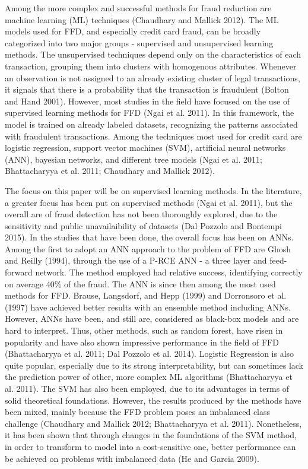 \documentclass[12pt,]{article}
\begin{document}
Among the more complex and successful methods for fraud reduction are
machine learning (ML) techniques (Chaudhary and Mallick 2012). The ML
models used for FFD, and especially credit card fraud, can be broadly
categorized into two major groups - supervised and unsupervised learning
methods. The unsupervised techniques depend only on the characteristics
of each transaction, grouping them into clusters with homogenous
attributes. Whenever an observation is not assigned to an already
existing cluster of legal transactions, it signals that there is a
probability that the transaction is fraudulent (Bolton and Hand 2001).
However, most studies in the field have focused on the use of supervised
learning methods for FFD (Ngai et al. 2011). In this framework, the
model is trained on already labeled datasets, recognizing the patterns
associated with fraudulent transactions. Among the techniques most used
for credit card are logistic regression, support vector machines (SVM),
artificial neural networks (ANN), bayesian networks, and different tree
models (Ngai et al. 2011; Bhattacharyya et al. 2011; Chaudhary and
Mallick 2012).

The focus on this paper will be on supervised learning methods. In the
literature, a greater focus has been put on supervised methods (Ngai et
al. 2011), but the overall are of fraud detection has not been
thoroughly explored, due to the sensitivity and public unavailaibility
of datasets (Dal Pozzolo and Bontempi 2015). In the studies that have
been done, the overall focus has been on ANNs. Among the first to adopt
an ANN approach to the problem of FFD are Ghosh and Reilly (1994),
through the use of a P-RCE ANN - a three layer and feed-forward network.
The method employed had relative success, identifying correctly on
average 40\% of the fraud. The ANN is since then among the most used
methods for FFD. Brause, Langsdorf, and Hepp (1999) and Dorronsoro et
al. (1997) have achieved better results with an ensemble method
including ANNs. However, ANNs have been, and still are, considered as
black-box models and are hard to interpret. Thus, other methods, such as
random forest, have risen in popularity and have also shown impressive
performance in the field of FFD (Bhattacharyya et al. 2011; Dal Pozzolo
et al. 2014). Logistic Regression is also quite popular, especially due
to its strong interpretability, but can sometimes lack the prediction
power of other, more complex ML algorithms (Bhattacharyya et al. 2011).
The SVM has also been employed, due to its advantages in terms of solid
theoretical foundations. However, the results produced by the methods
have been mixed, mainly because the FFD problem poses an imbalanced
class challenge (Chaudhary and Mallick 2012; Bhattacharyya et al. 2011).
Nonetheless, it has been shown that through changes in the foundations
of the SVM method, in order to transform to model into a cost-sensitive
one, better performance can be achieved on problems with imbalanced data
(He and Garcia 2009).
\end{document}
